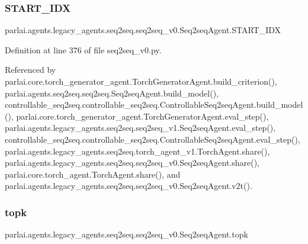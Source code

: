 \subsubsection{\texorpdfstring{S\+T\+A\+R\+T\+\_\+\+I\+DX}{START\_IDX}}
{\footnotesize\ttfamily parlai.\+agents.\+legacy\+\_\+agents.\+seq2seq.\+seq2seq\+\_\+v0.\+Seq2seq\+Agent.\+S\+T\+A\+R\+T\+\_\+\+I\+DX}



Definition at line 376 of file seq2seq\+\_\+v0.\+py.



Referenced by parlai.\+core.\+torch\+\_\+generator\+\_\+agent.\+Torch\+Generator\+Agent.\+build\+\_\+criterion(), parlai.\+agents.\+seq2seq.\+seq2seq.\+Seq2seq\+Agent.\+build\+\_\+model(), controllable\+\_\+seq2seq.\+controllable\+\_\+seq2seq.\+Controllable\+Seq2seq\+Agent.\+build\+\_\+model(), parlai.\+core.\+torch\+\_\+generator\+\_\+agent.\+Torch\+Generator\+Agent.\+eval\+\_\+step(), parlai.\+agents.\+legacy\+\_\+agents.\+seq2seq.\+seq2seq\+\_\+v1.\+Seq2seq\+Agent.\+eval\+\_\+step(), controllable\+\_\+seq2seq.\+controllable\+\_\+seq2seq.\+Controllable\+Seq2seq\+Agent.\+eval\+\_\+step(), parlai.\+agents.\+legacy\+\_\+agents.\+seq2seq.\+torch\+\_\+agent\+\_\+v1.\+Torch\+Agent.\+share(), parlai.\+agents.\+legacy\+\_\+agents.\+seq2seq.\+seq2seq\+\_\+v0.\+Seq2seq\+Agent.\+share(), parlai.\+core.\+torch\+\_\+agent.\+Torch\+Agent.\+share(), and parlai.\+agents.\+legacy\+\_\+agents.\+seq2seq.\+seq2seq\+\_\+v0.\+Seq2seq\+Agent.\+v2t().

\mbox{\label{classparlai_1_1agents_1_1legacy__agents_1_1seq2seq_1_1seq2seq__v0_1_1Seq2seqAgent_ac0b7a3b712fe92dbabee7f31972b8a47}} 
\subsubsection{\texorpdfstring{topk}{topk}}
{\footnotesize\ttfamily parlai.\+agents.\+legacy\+\_\+agents.\+seq2seq.\+seq2seq\+\_\+v0.\+Seq2seq\+Agent.\+topk}




